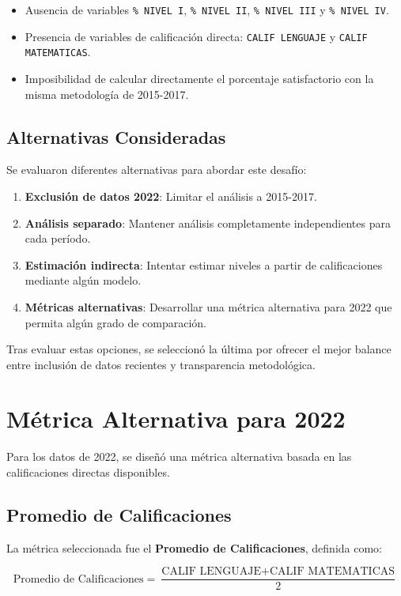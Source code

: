 \begin{itemize}
    \item Ausencia de variables \texttt{\% NIVEL I}, \texttt{\% NIVEL II}, \texttt{\% NIVEL III} y \texttt{\% NIVEL IV}.
    \item Presencia de variables de calificación directa: \texttt{CALIF LENGUAJE} y \texttt{CALIF MATEMATICAS}.
    \item Imposibilidad de calcular directamente el porcentaje satisfactorio con la misma metodología de 2015-2017.
\end{itemize}

\subsection{Alternativas Consideradas}
Se evaluaron diferentes alternativas para abordar este desafío:

\begin{enumerate}
    \item \textbf{Exclusión de datos 2022}: Limitar el análisis a 2015-2017.
    \item \textbf{Análisis separado}: Mantener análisis completamente independientes para cada período.
    \item \textbf{Estimación indirecta}: Intentar estimar niveles a partir de calificaciones mediante algún modelo.
    \item \textbf{Métricas alternativas}: Desarrollar una métrica alternativa para 2022 que permita algún grado de comparación.
\end{enumerate}

Tras evaluar estas opciones, se seleccionó la última por ofrecer el mejor balance entre inclusión de datos recientes y transparencia metodológica.

\section{Métrica Alternativa para 2022}
Para los datos de 2022, se diseñó una métrica alternativa basada en las calificaciones directas disponibles.

\subsection{Promedio de Calificaciones}
La métrica seleccionada fue el \textbf{Promedio de Calificaciones}, definida como:

\begin{equation}
\text{Promedio de Calificaciones} = \frac{\text{CALIF LENGUAJE} + \text{CALIF MATEMATICAS}}{2}
\end{equation}

